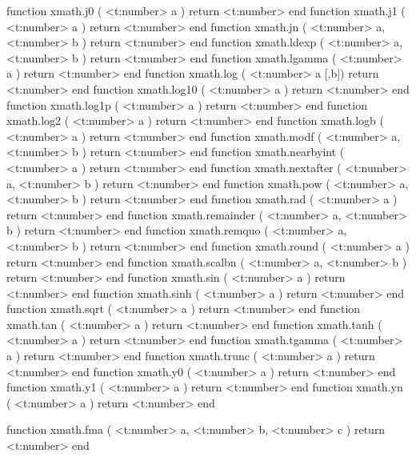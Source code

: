 function xmath.j0         ( <t:number> a )               return <t:number> end
function xmath.j1         ( <t:number> a )               return <t:number> end
function xmath.jn         ( <t:number> a, <t:number> b ) return <t:number> end
function xmath.ldexp      ( <t:number> a, <t:number> b ) return <t:number> end
function xmath.lgamma     ( <t:number> a )               return <t:number> end
function xmath.log        ( <t:number> a [,b])           return <t:number> end
function xmath.log10      ( <t:number> a )               return <t:number> end
function xmath.log1p      ( <t:number> a )               return <t:number> end
function xmath.log2       ( <t:number> a )               return <t:number> end
function xmath.logb       ( <t:number> a )               return <t:number> end
function xmath.modf       ( <t:number> a, <t:number> b ) return <t:number> end
function xmath.nearbyint  ( <t:number> a )               return <t:number> end
function xmath.nextafter  ( <t:number> a, <t:number> b ) return <t:number> end
function xmath.pow        ( <t:number> a, <t:number> b ) return <t:number> end
function xmath.rad        ( <t:number> a )               return <t:number> end
function xmath.remainder  ( <t:number> a, <t:number> b ) return <t:number> end
function xmath.remquo     ( <t:number> a, <t:number> b ) return <t:number> end
function xmath.round      ( <t:number> a )               return <t:number> end
function xmath.scalbn     ( <t:number> a, <t:number> b ) return <t:number> end
function xmath.sin        ( <t:number> a )               return <t:number> end
function xmath.sinh       ( <t:number> a )               return <t:number> end
function xmath.sqrt       ( <t:number> a )               return <t:number> end
function xmath.tan        ( <t:number> a )               return <t:number> end
function xmath.tanh       ( <t:number> a )               return <t:number> end
function xmath.tgamma     ( <t:number> a )               return <t:number> end
function xmath.trunc      ( <t:number> a )               return <t:number> end
function xmath.y0         ( <t:number> a )               return <t:number> end
function xmath.y1         ( <t:number> a )               return <t:number> end
function xmath.yn         ( <t:number> a )               return <t:number> end

function xmath.fma (
    <t:number> a,
    <t:number> b,
    <t:number> c
)
    return <t:number>
end
\stoptyping

\stopsubsection

\stopsubsection

